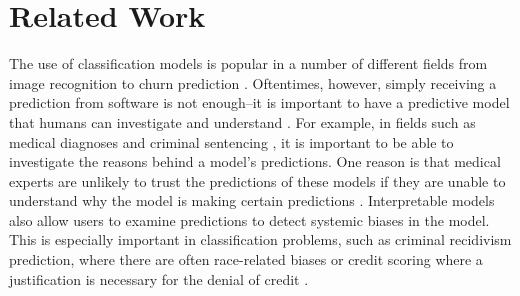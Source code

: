
\chapter{Related Work}

The use of classification models is popular in a number of different fields from image recognition \cite{LeCunBoBeHa98} to churn prediction \cite{LemmensCr06}.
Oftentimes, however, simply receiving a prediction from software is not enough--it is important to have a predictive model that humans can investigate and understand \cite{Bratko97, Quinlan99, Ruping06, MartensVaVeBa11, Freitas14}.
For example, in fields such as medical diagnoses \cite{BellazziZu08} and criminal sentencing \cite{LarsonMaKiAn16}, it is important to be able to investigate the reasons behind a model's predictions.
One reason is that medical experts are unlikely to trust the predictions of these models if they are unable to understand why the model is making certain predictions \cite{Lavrač99}.
Interpretable models also allow users to examine predictions to detect systemic biases in the model.
This is especially important in classification problems, such as criminal recidivism prediction, where there are often race-related biases \cite{LarsonMaKiAn16} or credit scoring where a justification is necessary for the denial of credit \cite{BaesensMuDeVaSe05}.


